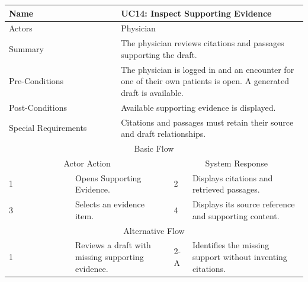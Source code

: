 \begin{reporttable}
\centering
\small
\caption{UC14: Inspect Supporting Evidence.}
\label{tab:kashaf:uc14}
\begin{tabular}{|p{}|p{}|p{}|p{}|p{}|}
\hline
\multicolumn{2}{|p{\dimexpr0.225\textwidth+2\tabcolsep+\arrayrulewidth\relax}|}{Name} & \multicolumn{3}{p{\dimexpr0.575\textwidth+4\tabcolsep+2\arrayrulewidth\relax}|}{UC14: Inspect Supporting Evidence} \\ \hline
\multicolumn{2}{|p{\dimexpr0.225\textwidth+2\tabcolsep+\arrayrulewidth\relax}|}{Actors} & \multicolumn{3}{p{\dimexpr0.575\textwidth+4\tabcolsep+2\arrayrulewidth\relax}|}{Physician} \\ \hline
\multicolumn{2}{|p{\dimexpr0.225\textwidth+2\tabcolsep+\arrayrulewidth\relax}|}{Summary} & \multicolumn{3}{p{\dimexpr0.575\textwidth+4\tabcolsep+2\arrayrulewidth\relax}|}{The physician reviews citations and passages supporting the draft.} \\ \hline
\multicolumn{2}{|p{\dimexpr0.225\textwidth+2\tabcolsep+\arrayrulewidth\relax}|}{Pre-Conditions} & \multicolumn{3}{p{\dimexpr0.575\textwidth+4\tabcolsep+2\arrayrulewidth\relax}|}{The physician is logged in and an encounter for one of their own patients is open. A generated draft is available.} \\ \hline
\multicolumn{2}{|p{\dimexpr0.225\textwidth+2\tabcolsep+\arrayrulewidth\relax}|}{Post-Conditions} & \multicolumn{3}{p{\dimexpr0.575\textwidth+4\tabcolsep+2\arrayrulewidth\relax}|}{Available supporting evidence is displayed.} \\ \hline
\multicolumn{2}{|p{\dimexpr0.225\textwidth+2\tabcolsep+\arrayrulewidth\relax}|}{Special Requirements} & \multicolumn{3}{p{\dimexpr0.575\textwidth+4\tabcolsep+2\arrayrulewidth\relax}|}{Citations and passages must retain their source and draft relationships.} \\ \hline
\multicolumn{5}{|c|}{Basic Flow} \\ \hline
\multicolumn{3}{|c|}{Actor Action} & \multicolumn{2}{c|}{System Response} \\ \hline
1 & \multicolumn{2}{p{\dimexpr0.37\textwidth+2\tabcolsep+\arrayrulewidth\relax}|}{Opens Supporting Evidence.} & 2 & Displays citations and retrieved passages. \\ \hline
3 & \multicolumn{2}{p{\dimexpr0.37\textwidth+2\tabcolsep+\arrayrulewidth\relax}|}{Selects an evidence item.} & 4 & Displays its source reference and supporting content. \\ \hline
\multicolumn{5}{|c|}{Alternative Flow} \\ \hline
1 & \multicolumn{2}{p{\dimexpr0.37\textwidth+2\tabcolsep+\arrayrulewidth\relax}|}{Reviews a draft with missing supporting evidence.} & 2-A & Identifies the missing support without inventing citations. \\ \hline
\end{tabular}
\end{reporttable}

